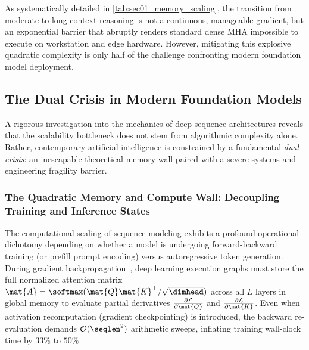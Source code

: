 As systematically detailed in \autoref{tab:sec01_memory_scaling}, the transition from moderate to long-context reasoning is not a continuous, manageable gradient, but an exponential barrier that abruptly renders standard dense MHA impossible to execute on workstation and edge hardware.
However, mitigating this explosive quadratic complexity is only half of the challenge confronting modern foundation model deployment.


\subsection{The Dual Crisis in Modern Foundation Models}
\label{subsec:dual_crisis}

A rigorous investigation into the mechanics of deep sequence architectures reveals that the scalability bottleneck does not stem from algorithmic complexity alone.
Rather, contemporary artificial intelligence is constrained by a fundamental \emph{dual crisis}: an inescapable theoretical memory wall paired with a severe systems and engineering fragility barrier.

\subsubsection{The Quadratic Memory and Compute Wall: Decoupling Training and Inference States}
\label{subsubsec:quadratic_wall}

The computational scaling of sequence modeling exhibits a profound operational dichotomy depending on whether a model is undergoing forward-backward training (or prefill prompt encoding) versus autoregressive token generation.
During gradient backpropagation~\cite{rumelhart1986learning}, deep learning execution graphs must store the full normalized attention matrix $\mat{A} = \softmax(\mat{Q}\mat{K}^\top / \sqrt{\dimhead})$ across all $L$ layers in global memory to evaluate partial derivatives $\frac{\partial \mathcal{L}}{\partial \mat{Q}}$ and $\frac{\partial \mathcal{L}}{\partial \mat{K}}$.
Even when activation recomputation (gradient checkpointing) is introduced, the backward re-evaluation demands $\mathcal{O}(\seqlen^2)$ arithmetic sweeps, inflating training wall-clock time by $33\%$ to $50\%$.

